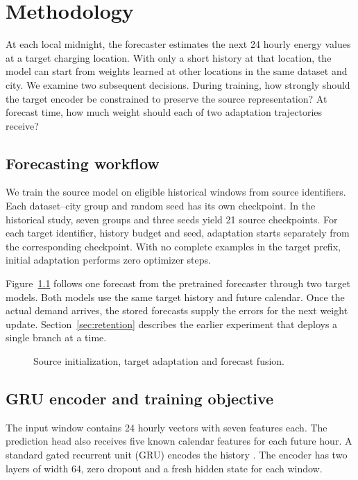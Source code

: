 \chapter{Methodology}
\label{chap:methodology}
At each local midnight, the forecaster estimates the next 24 hourly energy values at a target charging location. With only a short history at that location, the model can start from weights learned at other locations in the same dataset and city. We examine two subsequent decisions. During training, how strongly should the target encoder be constrained to preserve the source representation? At forecast time, how much weight should each of two adaptation trajectories receive?

\section{Forecasting workflow}
We train the source model on eligible historical windows from source identifiers. Each dataset--city group and random seed has its own checkpoint. In the historical study, seven groups and three seeds yield 21 source checkpoints. For each target identifier, history budget and seed, adaptation starts separately from the corresponding checkpoint. With no complete examples in the target prefix, initial adaptation performs zero optimizer steps.

Figure~\ref{fig:ch4fusion} follows one forecast from the pretrained forecaster through two target models. Both models use the same target history and future calendar. Once the actual demand arrives, the stored forecasts supply the errors for the next weight update. Section~\ref{sec:retention} describes the earlier experiment that deploys a single branch at a time.

\begin{figure}[H]\centering
\resizebox{\linewidth}{!}{}
\caption{Source initialization, target adaptation and forecast fusion.}\label{fig:ch4fusion}
\end{figure}

\section{GRU encoder and training objective}
The input window contains 24 hourly vectors with seven features each. The prediction head also receives five known calendar features for each future hour. A standard gated recurrent unit (GRU) encodes the history \cite{cho2014}. The encoder has two layers of width 64, zero dropout and a fresh hidden state for each window.

